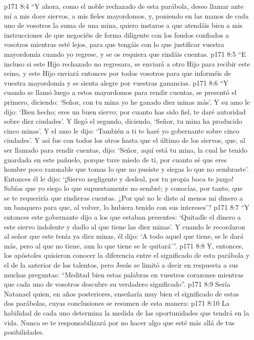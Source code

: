 \vs p171 8:4 “Y ahora, como el noble rechazado de esta parábola, deseo llamar ante mí a mis doce siervos, a mis fieles mayordomos, y, poniendo en las manos de cada uno de vosotros la suma de una mina, quiero instaros a que atendáis bien a mis instrucciones de que negociéis de forma diligente con los fondos confiados a vosotros mientras esté lejos, para que tengáis con lo que justificar vuestra mayordomía cuando yo regrese, y se os requiera que rindáis cuentas.
\vs p171 8:5 “E incluso si este Hijo rechazado no regresara, se enviará a otro Hijo para recibir este reino, y este Hijo enviará entonces por todos vosotros para que informéis de vuestra mayordomía y se sienta alegre por vuestras ganancias.
\vs p171 8:6 “Y cuando se llamó luego a estos mayordomos para rendir cuentas, se presentó el primero, diciendo: ‘Señor, con tu mina yo he ganado diez minas más’. Y su amo le dijo: ‘Bien hecho; eres un buen siervo; por cuanto has sido fiel, te daré autoridad sobre diez ciudades’. Y llegó el segundo, diciendo, ‘Señor, tu mina ha producido cinco minas’. Y el amo le dijo: ‘También a ti te haré yo gobernante sobre cinco ciudades’. Y así fue con todos los otros hasta que el último de los siervos, que, al ser llamado para rendir cuentas, dijo: ‘Señor, aquí está tu mina, la cual he tenido guardada en este pañuelo, porque tuve miedo de ti, por cuanto sé que eres hombre poco razonable que tomas lo que no pusiste y siegas lo que no sembraste’. Entonces él le dijo: ‘¡Siervo negligente y desleal, por tu propia boca te juzgo! Sabías que yo siego lo que supuestamente no sembré; y conocías, por tanto, que se te requeriría que rindieras cuentas. ¿Por qué no le diste al menos mi dinero a un banquero para que, al volver, lo hubiera tenido con sus intereses’?
\vs p171 8:7 “Y entonces este gobernante dijo a los que estaban presentes: ‘Quitadle el dinero a este siervo indolente y dadlo al que tiene las diez minas’. Y cuando le recordaron al señor que este tenía ya diez minas, él dijo: ‘A todo aquel que tiene, se le dará más, pero al que no tiene, aun lo que tiene se le quitará’”.
\vs p171 8:8 \pc Y, entonces, los apóstoles quisieron conocer la diferencia entre el significado de esta parábola y el de la anterior de los talentos, pero Jesús se limitó a decir en respuesta a sus muchas preguntas: “Meditad bien estas palabras en vuestros corazones mientras que cada uno de vosotros descubre su verdadero significado”.
\vs p171 8:9 Sería Natanael quien, en años posteriores, enseñaría muy bien el significado de estas dos parábolas, cuyas conclusiones se resumen de esta manera:
\vs p171 8:10 La habilidad de cada uno determina la medida de las oportunidades que tendrá en la vida. Nunca se te responsabilizará por no hacer algo que esté más allá de tus posibilidades.
